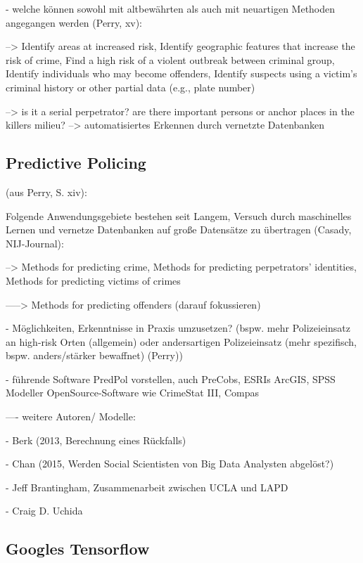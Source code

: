 \documentclass[a4paper,12pt,parskip,bibtotoc,liststotoc]{article}
\begin{document}
- welche können sowohl mit altbewährten als auch mit neuartigen Methoden angegangen werden (Perry, xv):

--> Identify areas at increased risk, Identify geographic features that increase the risk of crime, Find a high risk of a violent outbreak between criminal group, Identify individuals who may become offenders,
Identify suspects using a victim’s criminal history or other partial data (e.g., plate number) 

--> is it a serial perpetrator? are there important persons or anchor places in the killers milieu? --> automatisiertes Erkennen durch vernetzte Datenbanken\\


\subsection{Predictive Policing}  

(aus Perry, S. xiv):

Folgende Anwendungsgebiete bestehen seit Langem, Versuch durch maschinelles Lernen und vernetze Datenbanken auf große Datensätze zu übertragen (Casady, NIJ-Journal): 

--> Methods for predicting crime,  Methods for predicting perpetrators’ identities, Methods for predicting victims of crimes

-----> Methods for predicting offenders (darauf fokussieren)

- Möglichkeiten, Erkenntnisse in Praxis umzusetzen? (bspw. mehr Polizeieinsatz an high-risk Orten (allgemein) oder andersartigen Polizeieinsatz (mehr spezifisch, bspw. anders/stärker bewaffnet) (Perry))

- führende Software PredPol vorstellen, auch PreCobs, ESRIs ArcGIS, SPSS Modeller OpenSource-Software wie CrimeStat III, Compas



---- weitere Autoren/ Modelle: 

- Berk (2013, Berechnung eines Rückfalls)

- Chan (2015, Werden Social Scientisten von Big Data Analysten abgelöst?)

- Jeff Brantingham, Zusammenarbeit zwischen UCLA und LAPD

- Craig D. Uchida\\ 


\subsection{Googles Tensorflow}  
\end{document}
